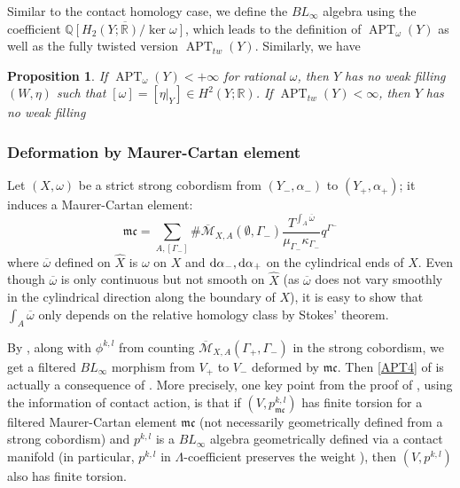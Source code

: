 \documentclass[11pt]{amsart}
\numberwithin{equation}{section}
\newtheorem{proposition}[theorem]{\textbf{Proposition}}
\def\R{\mathbb{R}}
\def\Q{{\mathbb Q}}
\def\cM{{\mathcal M}}
\def\mc{{\mathfrak {mc}}}
\def\rd{{\rm d}}
\DeclareMathOperator{\APT}{APT}
\begin{document}
Similar to the contact homology case, we define the $BL_{\infty}$ algebra using the coefficient $\overline{\Q[H_2(Y;\R)/\ker \omega]}$, which leads to the definition of $\APT_{\omega}(Y)$ as well as the fully twisted version $\APT_{tw}(Y)$. Similarly, we have
\begin{proposition}
    If $\APT_{\omega}(Y)<+\infty$ for rational $\omega$, then $Y$ has no weak filling $(W,\eta)$ such that $[\omega]=[\eta|_Y]\in H^2(Y;\R)$. If $\APT_{tw}(Y)<\infty$, then $Y$ has no weak filling
\end{proposition}







\subsubsection{Deformation by Maurer-Cartan element}
Let $(X,\omega)$ be a strict strong cobordism from $(Y_-,\alpha_-)$ to $(Y_+,\alpha_+)$; it induces a Maurer-Cartan element:
$$\mc= \sum_{A,[\Gamma_-]} \# \overline{\cM}_{X,A}(\emptyset, \Gamma_-)\frac{T^{\int_A \overline{\omega}}}{\mu_{\Gamma_-}\kappa_{\Gamma_-}}q^{\Gamma^-}$$
where $\overline{\omega}$ defined on $\widehat{X}$ is $\omega$ on $X$ and $\rd \alpha_-,\rd\alpha_+$ on the cylindrical ends of $X$. Even though $\overline{\omega}$ is only continuous but not smooth on $\widehat{X}$ (as $\overline{\omega}$ does not vary smoothly in the cylindrical direction along the boundary of $X$), it is easy to show that $\int_A \overline{\omega}$ only depends on the relative homology class by Stokes' theorem.

By \cite[Proposition 3.9]{moreno2024rsft}, along with $\phi^{k,l}$ from counting  $\overline{\cM}_{X,A}(\Gamma_+, \Gamma_-)$ in the strong cobordism, we get a filtered $BL_\infty$ morphism from $V_+$ to $V_-$ deformed by $\mc$. Then \eqref{APT4} of  is actually a consequence of . More precisely, one key point from the proof of \cite[Theorem 1.1]{moreno2024rsft}, using the information of contact action, is that if $(V,p^{k,l}_{\mc})$ has finite torsion for a filtered Maurer-Cartan element $\mc$ (not necessarily geometrically defined from a strong cobordism) and $p^{k,l}$ is a $BL_\infty$ algebra geometrically defined via a contact manifold (in particular, $p^{k,l}$ in $\Lambda$-coefficient preserves the weight \cite[Definition 3.3]{moreno2024rsft}), then $(V,p^{k,l})$ also has finite torsion. 
\end{document}
